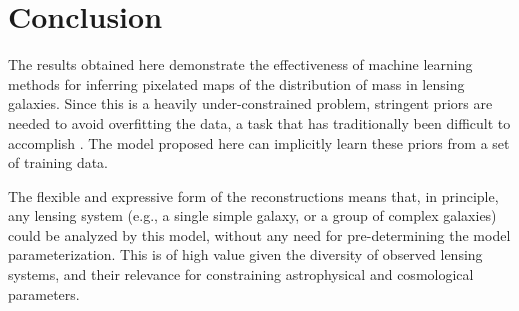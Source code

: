 

\section{Conclusion}\label{sec:conclusion}


The results obtained here demonstrate the effectiveness of machine learning methods for inferring pixelated maps of the distribution of mass in lensing galaxies. Since this is a heavily under-constrained problem, stringent priors are needed to avoid overfitting the data, a task that has traditionally been difficult to accomplish \citep[e.g.,][]{Saha1997}. The model proposed here can implicitly learn these priors from a set of training data. 

The flexible and expressive form of the reconstructions means that, in principle, any lensing system (e.g., a single simple galaxy, or a group of complex galaxies) could be analyzed by this model, without any need for pre-determining the model parameterization. This is of high value given the diversity of observed lensing systems, and their relevance for constraining astrophysical and cosmological parameters. 

